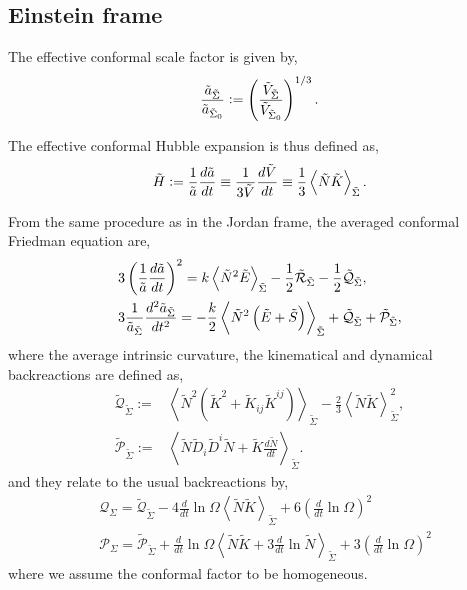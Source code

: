 \subsection{Einstein frame}

The effective conformal scale factor is given by,
\begin{equation}
    \frac{\Tilde{a}_{\Tilde{\Sigma}}}{\Tilde{a}_{\Tilde{\Sigma}_0}}:=\left(\frac{\Tilde{V}_{\Tilde{\Sigma}}}{\Tilde{V}_{\Tilde{\Sigma}_0}}\right)^{1/3}.
\end{equation}

The effective conformal Hubble expansion is thus defined as,
\begin{equation}
    \Tilde{H} := \frac{1}{\Tilde{a}}\frac{d\Tilde{a}}{dt}\equiv \frac{1}{3\Tilde{V}}\frac{d\Tilde{V}}{dt}\equiv\frac{1}{3}\left\langle \Tilde{N}\Tilde{K} \right\rangle_{\Tilde{\Sigma}}.
\end{equation}

From the same procedure as in the Jordan frame, the averaged conformal Friedman equation are,
\begin{align}
    &3\left(\frac{1}{\Tilde{a}}\frac{d\Tilde{a}}{dt}\right)^2 = k\left\langle \Tilde{N}^2\Tilde{E}\right\rangle_{\Tilde{\Sigma}}-\frac{1}{2}\Tilde{\mathcal{R}}_{\Tilde{\Sigma}}-\frac{1}{2}\Tilde{\mathcal{Q}}_{\Tilde{\Sigma}},\\
    &3\frac{1}{\Tilde{a}_{\Tilde{\Sigma}}}\frac{d^2\Tilde{a}_{\Tilde{\Sigma}}}{dt^2}=-\frac{k}{2}\left\langle \Tilde{N}^2\left(\Tilde{E}+\Tilde{S}\right)\right\rangle_{\Tilde{\Sigma}}+\Tilde{\mathcal{Q}}_{\Tilde{\Sigma}}+\Tilde{\mathcal{P}}_{\Tilde{\Sigma}},
\end{align}
where the average intrinsic curvature, the kinematical and dynamical backreactions are defined as,
\begin{align}
    \tilde{\mathcal{Q}}_{\tilde{\Sigma}}:=& \left\langle \tilde{N}^2\left(\tilde{K}^2+\tilde{K}_{ij}\tilde{K}^{ij}\right)\right\rangle_{\tilde{\Sigma}}-\frac{2}{3}\left\langle \tilde{N}\tilde{K}\right\rangle_{\tilde{\Sigma}}^2, \\
    \tilde{\mathcal{P}}_{\tilde{\Sigma}}:=&\left\langle \tilde{N} \tilde{D}_i \tilde{D}^i \tilde{N}+\tilde{K}\frac{d\tilde{N}}{dt}\right\rangle_{\tilde{\Sigma}}.
\end{align}
and they relate to the usual backreactions by,
\begin{align}
    &\mathcal{Q}_\Sigma = \tilde{\mathcal{Q}}_{\tilde{\Sigma}} - 4 \frac{d}{dt}\ln\Omega\left\langle  \tilde{N}\tilde{K}\right\rangle_{\tilde{\Sigma}}+6\left(\frac{d}{dt}\ln\Omega\right)^2\\
    &\mathcal{P}_\Sigma = \tilde{\mathcal{P}}_{\tilde{\Sigma}}+\frac{d}{dt}\ln\Omega\left\langle \tilde{N}\tilde{K}+3\frac{d}{dt}\ln\tilde{N}\right\rangle_{\tilde{\Sigma}}+3\left(\frac{d}{dt}\ln\Omega\right)^2
\end{align}
where we assume the conformal factor to be homogeneous.

